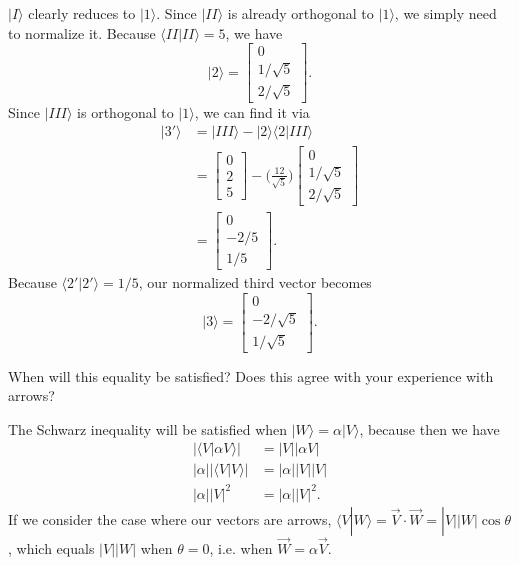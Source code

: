 \documentclass[../principles-of-quantum-mechanics.tex]{subfiles}
\begin{document}
\begin{questions}
\begin{solution}
	$|I\rangle$ clearly reduces to $|1\rangle$. Since $|II\rangle$ is already orthogonal to $|1\rangle$, we simply need to normalize it. Because $\langle{II}|II\rangle=5$, we have
	\[
		|2\rangle = \begin{bmatrix}
		0 \\ 1/\sqrt{5} \\ 2/\sqrt{5}
		\end{bmatrix}.
	\]
	Since $|III\rangle$ is orthogonal to $|1\rangle$, we can find it via
	\begin{align*}
		|3'\rangle &= |III\rangle - |2\rangle\langle{2}|III\rangle \\
		&= \begin{bmatrix}0 \\ 2 \\ 5\end{bmatrix} - \Big(\frac{12}{\sqrt{5}}\Big)\begin{bmatrix} 0 \\ 1/\sqrt{5} \\ 2/\sqrt{5} \end{bmatrix} \\
		&= \begin{bmatrix}
		0 \\ -2/5 \\ 1/5
		\end{bmatrix}.
	\end{align*}
	Because $\langle{2}'|2'\rangle=1/5$, our normalized third vector becomes
	\[
		|3\rangle = \begin{bmatrix}
		0 \\ -2/\sqrt{5} \\ 1/\sqrt{5}
		\end{bmatrix}.
	\]
\end{solution}

\question When will this equality be satisfied? Does this agree with your experience with arrows?

\begin{solution}
	The Schwarz inequality will be satisfied when $|W\rangle=\alpha|V\rangle$, because then we have
	\begin{align*}
		|\langle{V}|\alpha{V}\rangle| &= |V||\alpha{V}| \\
		|\alpha||\langle{V}|V\rangle| &= |\alpha||V||V| \\
		|\alpha||V|^2 &= |\alpha||V|^2.
	\end{align*}
	If we consider the case where our vectors are arrows, $\langle{V}|W\rangle=\vec{V}\cdot\vec{W}=|V||W|\cos\theta$, which equals $|V||W|$ when $\theta=0$, i.e. when $\vec{W}=\alpha\vec{V}$.
\end{solution}


\end{questions}
\end{document}
